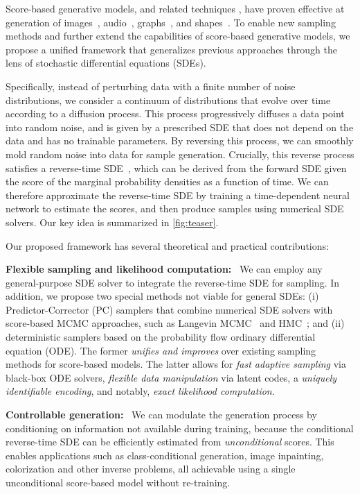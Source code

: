 Score-based generative models, and related techniques \citep{bordes2017learning,goyal2017variational, du2019implicit}, have proven effective at generation of images~\citep{song2019generative,song2020improved,ho2020denoising}, audio~\citep{chen2020wavegrad,kong2020diffwave}, graphs~\citep{niu20a}, and shapes~\citep{ShapeGF}. To enable new sampling methods and further extend the capabilities of score-based generative models, we propose a unified framework that generalizes previous approaches through the lens of stochastic differential equations (SDEs).

Specifically, instead of perturbing data with a finite number of noise distributions, we consider a continuum of distributions that evolve over time according to a diffusion process. This process progressively diffuses a data point into random noise, and is given by a prescribed SDE that does not depend on the data and has no trainable parameters. By reversing this process, we can smoothly mold random noise into data for sample generation. Crucially, this reverse process satisfies a reverse-time SDE~\citep{Anderson1982-ny}, which can be derived from the forward SDE given the score of the marginal probability densities as a function of time. We can therefore approximate the reverse-time SDE by training a time-dependent neural network to estimate the scores, and then produce samples using numerical SDE solvers. Our key idea is summarized in \ref{fig:teaser}.

Our proposed framework has several theoretical and practical contributions: 

\textbf{Flexible sampling and likelihood computation:}~ We can employ any general-purpose SDE solver to integrate the reverse-time SDE for sampling. In addition, we propose two special methods not viable for general SDEs: (i) Predictor-Corrector (PC) samplers that combine numerical SDE solvers with score-based MCMC approaches, such as Langevin MCMC~\citep{parisi1981correlation} and HMC~\citep{neal2011mcmc}; and (ii) deterministic samplers based on the probability flow ordinary differential equation (ODE). The former \emph{unifies and improves} over existing sampling methods for score-based models. The latter allows for \emph{fast adaptive sampling} via black-box ODE solvers, \emph{flexible data manipulation} via latent codes, a \emph{uniquely identifiable encoding}, and notably, \emph{exact likelihood computation}.

\textbf{Controllable generation:}~ We can modulate the generation process by conditioning on information not available during training, because the conditional reverse-time SDE can be efficiently estimated from \emph{unconditional} scores. This enables applications such as class-conditional generation, image inpainting, colorization and other inverse problems, all achievable using a single unconditional score-based model without re-training.

